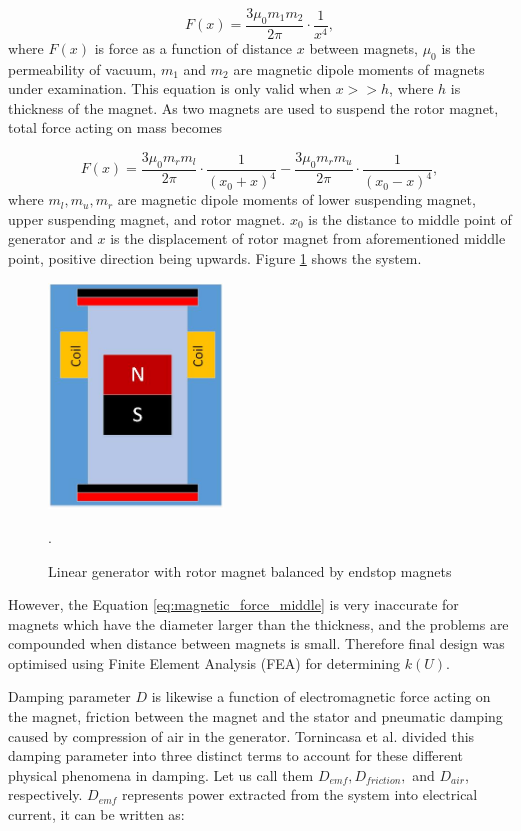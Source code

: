 \begin{equation}\label{eq:magnetic_force}
  F(x) = \frac{3 \mu_0 m_1 m_2}{2 \pi} \cdot \frac{1}{x^4},
\end{equation}
where $F(x)$ is force as a function of distance $x$ between magnets, $\mu_0$ is the permeability of vacuum, $ m_1 $ and $ m_2 $ are magnetic dipole moments of magnets under examination. This equation is only valid when $x >> h$, where $h$ is thickness of the magnet. As two magnets are used to suspend the rotor magnet, total force acting on mass becomes 

\begin{equation}\label{eq:magnetic_force_middle}
  F(x) = \frac{3 \mu_0 m_r m_l}{2 \pi} \cdot \frac{1}{(x_0+x)^4} - \frac{3 \mu_0 m_r m_u}{2 \pi} \cdot \frac{1}{(x_0-x)^4},
\end{equation}
where $m_l, m_u, m_r$ are magnetic dipole moments of lower suspending magnet, upper suspending magnet, and rotor magnet. $x_0$ is the distance to middle point of generator and $x$ is the displacement of rotor magnet from aforementioned middle point, positive direction being upwards. Figure \ref{fig:lg} shows the system.

\begin{figure}[htb]
\begin{center}
\includegraphics[height=6cm]{images/own_dwg/generator}
\end{center}
\caption{Linear generator with rotor magnet balanced by endstop magnets}.
\label{fig:lg}
\end{figure}

However, the Equation \eqref{eq:magnetic_force_middle} is very inaccurate for magnets which have the diameter larger than the thickness, and the problems are compounded when distance between magnets is small. Therefore final design was optimised using Finite Element Analysis (FEA) for determining $k(U)$. 

Damping parameter $D$ is likewise a function of electromagnetic force acting on the magnet, friction between the magnet and the stator and pneumatic damping caused by compression of air in the generator. Tornincasa et al. \cite{Tornincasa2012} divided this damping parameter into three distinct terms to account for these different physical phenomena in damping. Let us call them $D_{emf}, D_{friction},$ and $D_{air}$, respectively. $D_{emf}$ represents power extracted from the system into electrical current, it can be written as:

